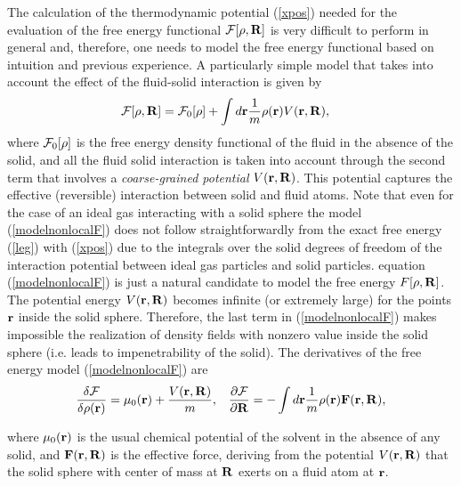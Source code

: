 \documentclass[b5paper,openright,10pt]{book}
\begin{document}
The calculation of the thermodynamic potential (\ref{xpos}) needed for
the evaluation of the free  energy functional ${\cal F}[\rho,{\bf R}]$
is very difficult  to perform in general and,  therefore, one needs to  model the
free energy functional based on intuition and previous experience. A
particularly simple model that takes into account the effect of the
fluid-solid interaction is given by
\begin{align}
  {\cal F}[\rho,{\bf R}]&={\cal F}_0[\rho]
+\int d{\bf r}\frac{1}{m}
\rho({\bf r})V({\bf r},{\bf R}),
\label{modelnonlocalF}
\end{align}
where ${\cal F}_0[\rho]$ is the  free energy density functional of the
fluid in the absence of the solid, and all the fluid solid interaction
is  taken  into  account  through  the second  term  that  involves  a
\textit{coarse-grained   potential}   $V({\bf  r},{\bf   R})$.    This
potential  captures  the  effective (reversible)  interaction  between
solid and fluid atoms.  Note  that even for the case of
  an   ideal  gas   interacting  with   a  solid   sphere  the   model
  (\ref{modelnonlocalF})  does not  follow  straightforwardly from  the
  exact free energy (\ref{leg}) with (\ref{xpos}) due to the integrals
  over  the solid  degrees  of freedom  of  the interaction  potential
  between    ideal     gas    particles    and     solid    particles.
  equation (\ref{modelnonlocalF}) is just a natural  candidate to model the free
  energy $F[\rho,{\bf R}]$. The potential energy $V({\bf r},{\bf R})$
becomes infinite (or extremely large)  for the points ${\bf r}$ inside
the solid  sphere. Therefore, the last  term in (\ref{modelnonlocalF})
makes impossible the realization of density fields with nonzero value
inside the solid sphere (i.e.  leads to impenetrability of the solid).
The derivatives of the free energy model (\ref{modelnonlocalF}) are
\begin{align}
  \frac{\delta{\cal F}}{\delta\rho({\bf r})}=\mu_0({\bf r})+\frac{V({\bf r},{\bf R})}{m},&&
  \frac{\partial{\cal F}}{\partial{\bf R}}=-\int d{\bf r}\frac{1}{m}\rho({\bf r}){\bf F}({\bf r},{\bf R}),
\end{align}


where $\mu_0({\bf r})$ is the  usual chemical potential of the solvent
in the  absence of any  solid, and ${\bf  F}({\bf r},{\bf R})$  is the
effective force, deriving from the potential $V({\bf r},{\bf R})$ that
the solid sphere  with center of mass  at ${\bf R}$ exerts  on a fluid
atom at ${\bf r}$.
\end{document}
